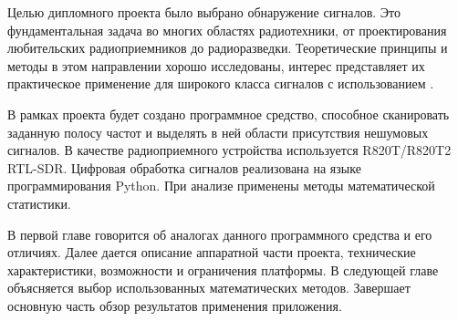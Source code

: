 Целью дипломного проекта было выбрано обнаружение сигналов. Это фундаментальная задача во многих областях радиотехники, от проектирования любительских радиоприемников до радиоразведки. Теоретические принципы и методы в этом направлении хорошо исследованы, интерес представляет их практическое применение для широкого класса сигналов с использованием \sdr.

В рамках проекта будет создано программное средство, способное сканировать заданную полосу частот и выделять в ней области присутствия нешумовых сигналов. В качестве радиоприемного устройства используется R820T/R820T2 RTL-SDR. Цифровая обработка сигналов реализована на языке программирования Python. При анализе применены методы математической статистики.

В первой главе говорится об аналогах данного программного средства и его отличиях. Далее дается описание аппаратной части проекта, технические характеристики, возможности и ограничения платформы. В следующей главе объясняется выбор использованных математических методов. Завершает основную часть обзор результатов применения приложения.
